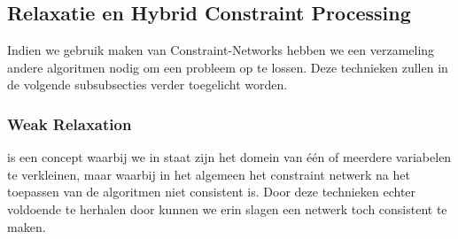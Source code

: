 \subsection{Relaxatie en Hybrid Constraint Processing}
\label{ss:relaxationAndHybridConstraintProcessing}
Indien we gebruik maken van Constraint-Networks hebben we een verzameling andere algoritmen nodig om een probleem op te lossen. Deze technieken zullen in de volgende subsubsecties verder toegelicht worden.
\subsubsection{Weak Relaxation}
 is een concept waarbij we in staat zijn het domein van \'e\'en of meerdere variabelen te verkleinen, maar waarbij in het algemeen het constraint netwerk na het toepassen van de algoritmen niet consistent is. Door deze technieken echter voldoende te herhalen door  kunnen we erin slagen een netwerk toch consistent te maken.

